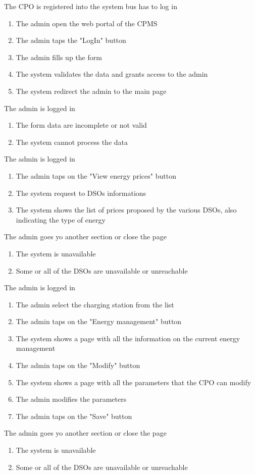 \begin{enumerate}
	{The CPO is registered into the system bus has to log in}
	{
	\begin{enumerate}[1.]
	\item The admin open the web portal of the CPMS
	\item The admin taps the "LogIn" button 
	\item The admin fills up the form
	\item The system validates the data and grants access to the admin
	\item The system redirect the admin to the main page
	\end{enumerate}
	}
	{The admin is logged in}
	{
	\begin{enumerate}[1.]
	\item The form data are incomplete or not valid 
	\item The system cannot process the data
	\end{enumerate}
	}
	
	
	{The admin is logged in }
	{
	\begin{enumerate}[1.]
	\item The admin taps on the "View energy prices" button 
	\item The system request to DSOs informations 
	\item The system shows the list of prices proposed by the various DSOs, also indicating the type of energy
	\end{enumerate}
	}
	{The admin goes yo another section or close the page }
	{
	\begin{enumerate}[1.]
	\item The system is unavailable
	\item Some or all of the DSOs are unavailable or unreachable
	\end{enumerate}
	}
	
	
	{The admin is logged in}
	{
	\begin{enumerate}[1.]
	\item The admin select the charging station from the list
	\item The admin taps on the "Energy management" button
	\item The system shows a page with all the information on the current energy management
	\item The admin taps on the "Modify" button
	\item The system shows a page with all the parameters that the CPO can modify
	\item The admin modifies the parameters
	\item The admin taps on the "Save" button
	\end{enumerate}
	}
	{The admin goes yo another section or close the page }
	{
	\begin{enumerate}[1.]
	\item The system is unavailable
	\item Some or all of the DSOs are unavailable or unreachable
	\end{enumerate}
	}
	

\end{enumerate}
